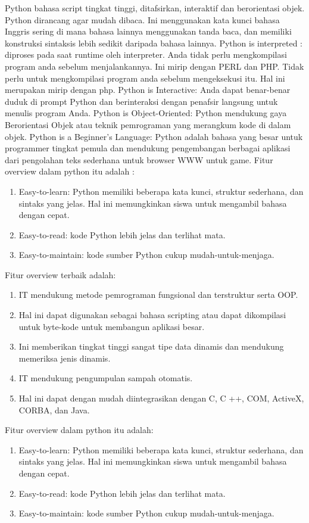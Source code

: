 Python bahasa script tingkat tinggi, ditafsirkan, interaktif dan berorientasi objek. Python dirancang agar mudah dibaca. Ini menggunakan kata kunci bahasa Inggris sering di mana bahasa lainnya menggunakan tanda baca, dan memiliki konstruksi sintaksis lebih sedikit daripada bahasa lainnya.
Python is interpreted : diproses pada saat runtime oleh interpreter. Anda tidak perlu mengkompilasi program anda sebelum menjalankannya. Ini mirip dengan PERL dan PHP.
Tidak perlu untuk mengkompilasi program anda sebelum mengeksekusi itu. Hal ini merupakan mirip dengan php.
Python is Interactive: Anda dapat benar-benar duduk di prompt Python dan berinteraksi dengan penafsir langsung untuk menulis program Anda.
Python is Object-Oriented: Python mendukung gaya Berorientasi Objek atau teknik pemrograman yang merangkum kode di dalam objek.
Python is a Beginner's Language: Python adalah bahasa yang besar untuk programmer tingkat pemula dan mendukung pengembangan berbagai aplikasi dari pengolahan teks sederhana untuk browser WWW untuk game.
Fitur overview dalam python itu adalah :
\begin {enumerate}
\item Easy-to-learn: Python memiliki beberapa kata kunci, struktur sederhana, dan sintaks yang jelas. Hal ini memungkinkan siswa untuk mengambil bahasa dengan cepat.
\item Easy-to-read: kode Python lebih jelas dan terlihat mata.
\item Easy-to-maintain: kode sumber Python cukup mudah-untuk-menjaga.
\end {enumerate}

Fitur overview terbaik adalah:
\begin {enumerate}
\item IT mendukung metode pemrograman fungsional dan terstruktur serta OOP.
\item Hal ini dapat digunakan sebagai bahasa scripting atau dapat dikompilasi untuk byte-kode untuk membangun aplikasi besar.
\item Ini memberikan tingkat tinggi sangat tipe data dinamis dan mendukung memeriksa jenis dinamis.
\item IT mendukung pengumpulan sampah otomatis.
\item Hal ini dapat dengan mudah diintegrasikan dengan C, C ++, COM, ActiveX, CORBA, dan Java.
\end {enumerate}

Fitur overview dalam python itu adalah:
\begin {enumerate}
\item Easy-to-learn: Python memiliki beberapa kata kunci, struktur sederhana, dan sintaks yang jelas. Hal ini memungkinkan siswa untuk mengambil bahasa dengan cepat.
\item Easy-to-read: kode Python lebih jelas dan terlihat mata.
\item Easy-to-maintain: kode sumber Python cukup mudah-untuk-menjaga.
\end {enumerate}

